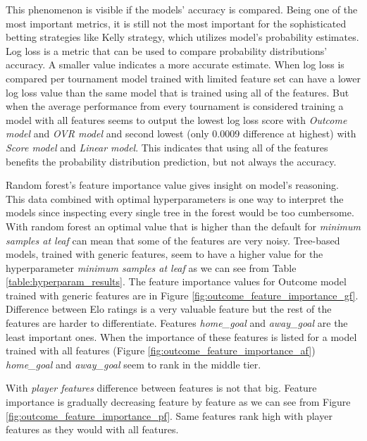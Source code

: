 This phenomenon is visible if the models' accuracy is compared. Being one of the most important metrics, it is still not the most important for the sophisticated betting strategies like Kelly strategy, which utilizes model's probability estimates. Log loss is a metric that can be used to compare probability distributions' accuracy. A smaller value indicates a more accurate estimate. When log loss is compared per tournament model trained with limited feature set can have a lower log loss value than the same model that is trained using all of the features. But when the average performance from every tournament is considered training a model with all features seems to output the lowest log loss score with \textit{Outcome model} and \textit{OVR model} and second lowest (only 0.0009 difference at highest) with \textit{Score model} and \textit{Linear model}. This indicates that using all of the features benefits the probability distribution prediction, but not always the accuracy.

Random forest's feature importance value gives insight on model's reasoning. This data combined with optimal hyperparameters is one way to interpret the models since inspecting every single tree in the forest would be too cumbersome. With random forest an optimal value that is higher than the default for \textit{minimum samples at leaf} can mean that some of the features are very noisy. Tree-based models, trained with generic features, seem to have a higher value for the hyperparameter \textit{minimum samples at leaf} as we can see from Table \ref{table:hyperparam_results}. The feature importance values for Outcome model trained with generic features are in Figure \ref{fig:outcome_feature_importance_gf}. Difference between Elo ratings is a very valuable feature but the rest of the features are harder to differentiate. Features \textit{home\_goal} and \textit{away\_goal} are the least important ones. When the importance of these features is listed for a model trained with all features (Figure \ref{fig:outcome_feature_importance_af}) \textit{home\_goal} and \textit{away\_goal} seem to rank in the middle tier.

With \textit{player features} difference between features is not that big. Feature importance is gradually decreasing feature by feature as we can see from Figure \ref{fig:outcome_feature_importance_pf}. Same features rank high with player features as they would with all features.

